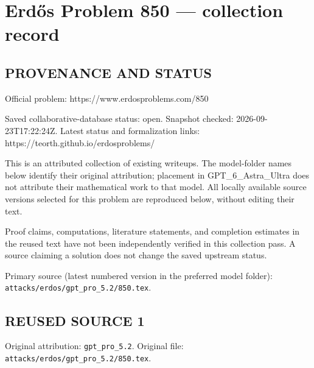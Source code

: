 \section*{Erd\H{o}s Problem 850 --- collection record}

\subsection*{PROVENANCE AND STATUS}
Official problem: https://www.erdosproblems.com/850

Saved collaborative-database status: open.
Snapshot checked: 2026-09-23T17:22:24Z.
Latest status and formalization links: https://teorth.github.io/erdosproblems/

This is an attributed collection of existing writeups. The model-folder names below identify their original attribution; placement in GPT\_6\_Astra\_Ultra does not attribute their mathematical work to that model. All locally available source versions selected for this problem are reproduced below, without editing their text.

Proof claims, computations, literature statements, and completion estimates in the reused text have not been independently verified in this collection pass. A source claiming a solution does not change the saved upstream status.

Primary source (latest numbered version in the preferred model folder): \texttt{attacks/erdos/gpt\_pro\_5.2/850.tex}.

\subsection*{REUSED SOURCE 1}
Original attribution: \texttt{gpt\_pro\_5.2}.
Original file: \texttt{attacks/erdos/gpt\_pro\_5.2/850.tex}.


